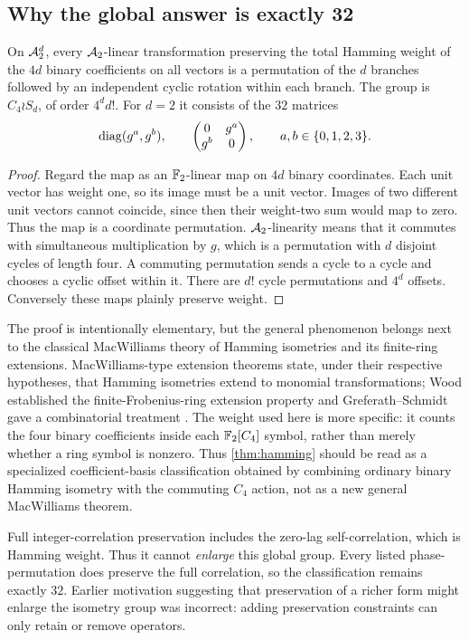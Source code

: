 \subsection{Why the global answer is exactly 32}
\begin{theorem}\label{thm:hamming}
On $\mathcal A_2^d$, every $\mathcal A_2$-linear transformation preserving the total Hamming weight of the $4d$ binary coefficients on all vectors is a permutation of the $d$ branches followed by an independent cyclic rotation within each branch. The group is $C_4\wr S_d$, of order $4^d d!$. For $d=2$ it consists of the $32$ matrices
\begin{equation}
 \operatorname{diag}(g^a,g^b),\qquad \begin{pmatrix}0&g^a\\g^b&0\end{pmatrix},\qquad a,b\in\{0,1,2,3\}.
\end{equation}
\end{theorem}
\begin{proof}
Regard the map as an $\mathbb F_2$-linear map on $4d$ binary coordinates. Each unit vector has weight one, so its image must be a unit vector. Images of two different unit vectors cannot coincide, since then their weight-two sum would map to zero. Thus the map is a coordinate permutation. $\mathcal A_2$-linearity means that it commutes with simultaneous multiplication by $g$, which is a permutation with $d$ disjoint cycles of length four. A commuting permutation sends a cycle to a cycle and chooses a cyclic offset within it. There are $d!$ cycle permutations and $4^d$ offsets. Conversely these maps plainly preserve weight.
\end{proof}
The proof is intentionally elementary, but the general phenomenon belongs next to the classical MacWilliams theory of Hamming isometries and its finite-ring extensions.  MacWilliams-type extension theorems state, under their respective hypotheses, that Hamming isometries extend to monomial transformations; Wood established the finite-Frobenius-ring extension property and Greferath--Schmidt gave a combinatorial treatment \cite{wood1999,greferath2000}.  The weight used here is more specific: it counts the four binary coefficients inside each $\mathbb F_2[C_4]$ symbol, rather than merely whether a ring symbol is nonzero.  Thus \cref{thm:hamming} should be read as a specialized coefficient-basis classification obtained by combining ordinary binary Hamming isometry with the commuting $C_4$ action, not as a new general MacWilliams theorem.

Full integer-correlation preservation includes the zero-lag self-correlation, which is Hamming weight. Thus it cannot \emph{enlarge} this global group. Every listed phase-permutation does preserve the full correlation, so the classification remains exactly $32$. Earlier motivation suggesting that preservation of a richer form might enlarge the isometry group was incorrect: adding preservation constraints can only retain or remove operators.

